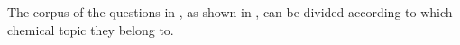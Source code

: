 



The corpus of the questions in \chembench, as shown in , can be divided according to which chemical topic they belong to.

